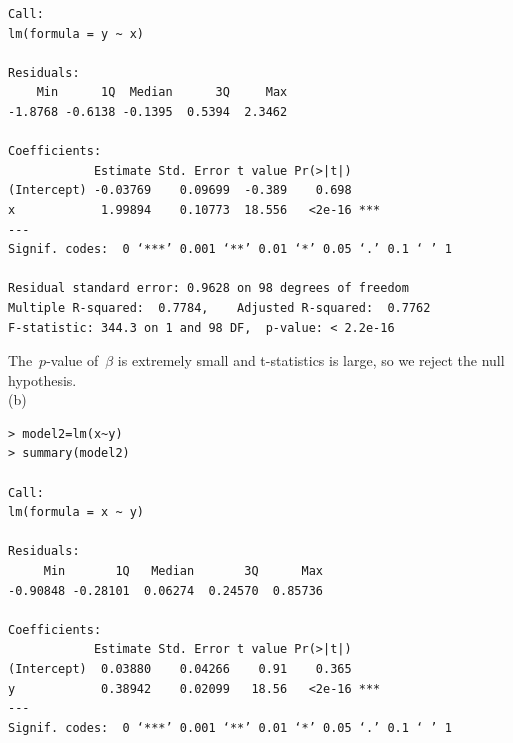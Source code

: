 \documentclass[12pt]{article}
\begin{document}
\begin{itemize}
\begin{verbatim}
Call:
lm(formula = y ~ x)

Residuals:
    Min      1Q  Median      3Q     Max
-1.8768 -0.6138 -0.1395  0.5394  2.3462

Coefficients:
            Estimate Std. Error t value Pr(>|t|)
(Intercept) -0.03769    0.09699  -0.389    0.698
x            1.99894    0.10773  18.556   <2e-16 ***
---
Signif. codes:  0 ‘***’ 0.001 ‘**’ 0.01 ‘*’ 0.05 ‘.’ 0.1 ‘ ’ 1

Residual standard error: 0.9628 on 98 degrees of freedom
Multiple R-squared:  0.7784,	Adjusted R-squared:  0.7762
F-statistic: 344.3 on 1 and 98 DF,  p-value: < 2.2e-16
\end{verbatim}
The\ $p$-value of\ $\beta$ is extremely small and t-statistics is large, so we reject the null hypothesis.\\[3ex]
(b)
\begin{verbatim}
> model2=lm(x~y)
> summary(model2)

Call:
lm(formula = x ~ y)

Residuals:
     Min       1Q   Median       3Q      Max
-0.90848 -0.28101  0.06274  0.24570  0.85736

Coefficients:
            Estimate Std. Error t value Pr(>|t|)
(Intercept)  0.03880    0.04266    0.91    0.365
y            0.38942    0.02099   18.56   <2e-16 ***
---
Signif. codes:  0 ‘***’ 0.001 ‘**’ 0.01 ‘*’ 0.05 ‘.’ 0.1 ‘ ’ 1


\end{verbatim}
\end{itemize}
\end{document}
